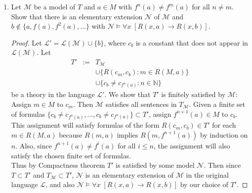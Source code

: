 \documentclass{article}
\begin{document}
\begin{enumerate}[label={\bf Q\arabic*:}]
\begin{enumerate}
\begin{proof}
          These relations will ensure that $\mathcal{N}$ is a model of $T$.
          Also, since $b\neq f^n(a)$ for all $n\in\mathbb{N}$, $c$ will
          witness $\mathcal{N}\models \exists x\; (R(x,a)\wedge\neg
          R(x,b))$. Also, since the new relations each involve the new
          element $c$, $\mathcal{N}$ is an extension of $\mathcal{M}$.
          Thus, from existential closure of $\mathcal{M}$, we have
          $\mathcal{M}\models \exists x\; (R(x,a)\wedge\neg R(x,b))$, a
          contradiction.
        \end{proof}

      \item Let $\mathcal{M}$ be a model of $T$ and $a\in M$ with
        $f^n(a)\neq f^m(a)$ for all $n\neq m$. Show that there is an
        elementary extension $\mathcal{N}$ of $\mathcal{M}$ and
        $b\not\in\{a,f(a),f^2(a),\ldots\}$ with $\mathcal{N}\models\forall
        x\; [R(x,a)\rightarrow R(x,b)]$.

        \begin{proof}
          Let $\mathcal{L}'=\mathcal{L}(\mathcal{M})\cup\{b\}$, where $c_b$
          is a constant that does not appear in $\mathcal{L}(\mathcal{M})$.
          Let
          \[\begin{array}{rrl}
            T' &:= &T_\mathcal{M} \\
              &&\cup\{R(c_m,c_b):m\in R(M,a)\} \\
              &&\cup\{c_b\neq c_{f^n(a)}:n\in\mathbb{N}\}
          \end{array}\]
          be a theory in the language $\mathcal{L}'$. We show that
          $T'$ is finitely satisfied by $\mathcal{M}$: Assign $m\in M$ to
          $c_m$. Then $\mathcal{M}$ satisfies all sentences in
          $T_\mathcal{M}$. Given a finite set of formulas
          $\{c_b\neq c_{f^{0}(a)},\ldots,c_b\neq c_{f^{n}(a)}\}\subset T'$,
          assign $f^{n+1}(a)\in M$ to $c_b$. This assignment will satisfy
          formulas of the form $R(c_m,c_b)\in T'$ for each $m\in R(M,a)$
          because $R(m,a)$ implies $R(m,f^{n+1}(a))$ by induction on $n$.
          Also, since $f^{n+1}(a)\neq f^i(a)$ for all $i\leq n$, the
          assignment will also satisfy the chosen finite set of formulas.
          \\

          Thus by Compactness theorem $T'$ is satisfied by some model
          $\mathcal{N}$. Then since $T\subset T'$ and $T_\mathcal{M}\subset
          T'$, $\mathcal{N}$ is an elementary extension of $\mathcal{M}$ in
          the original language $\mathcal{L}$, and also
          $\mathcal{N}\models\forall x\; [R(x,a)\rightarrow R(x,b)]$ by our
          choice of $T'$.
        \end{proof}


\end{enumerate}
\end{enumerate}
\end{document}
